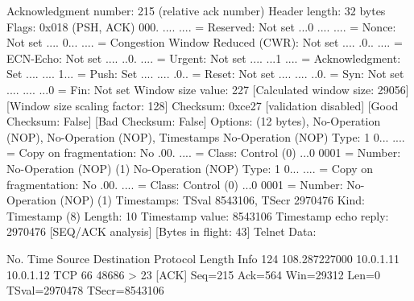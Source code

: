     Acknowledgment number: 215    (relative ack number)
    Header length: 32 bytes
    Flags: 0x018 (PSH, ACK)
        000. .... .... = Reserved: Not set
        ...0 .... .... = Nonce: Not set
        .... 0... .... = Congestion Window Reduced (CWR): Not set
        .... .0.. .... = ECN-Echo: Not set
        .... ..0. .... = Urgent: Not set
        .... ...1 .... = Acknowledgment: Set
        .... .... 1... = Push: Set
        .... .... .0.. = Reset: Not set
        .... .... ..0. = Syn: Not set
        .... .... ...0 = Fin: Not set
    Window size value: 227
    [Calculated window size: 29056]
    [Window size scaling factor: 128]
    Checksum: 0xce27 [validation disabled]
        [Good Checksum: False]
        [Bad Checksum: False]
    Options: (12 bytes), No-Operation (NOP), No-Operation (NOP), Timestamps
        No-Operation (NOP)
            Type: 1
                0... .... = Copy on fragmentation: No
                .00. .... = Class: Control (0)
                ...0 0001 = Number: No-Operation (NOP) (1)
        No-Operation (NOP)
            Type: 1
                0... .... = Copy on fragmentation: No
                .00. .... = Class: Control (0)
                ...0 0001 = Number: No-Operation (NOP) (1)
        Timestamps: TSval 8543106, TSecr 2970476
            Kind: Timestamp (8)
            Length: 10
            Timestamp value: 8543106
            Timestamp echo reply: 2970476
    [SEQ/ACK analysis]
        [Bytes in flight: 43]
Telnet
    Data: 

No.     Time           Source                Destination           Protocol Length Info
    124 108.287227000  10.0.1.11             10.0.1.12             TCP      66     48686 > 23 [ACK] Seq=215 Ack=564 Win=29312 Len=0 TSval=2970478 TSecr=8543106

